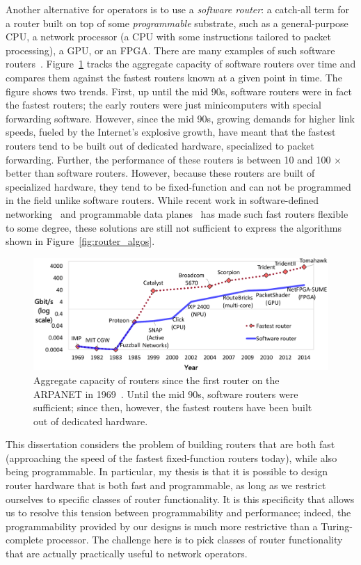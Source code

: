 Another alternative for operators is to use a \textit{software router}: a
catch-all term for a router built on top of some \textit{programmable}
substrate, such as a general-purpose CPU, a network processor (a CPU with some
instructions tailored to packet processing), a GPU, or an FPGA. There are many
examples of such software routers~\cite{click, routebrucks, netfpga,
packetshader, ixp}. Figure~\ref{fig:router_evolution} tracks the aggregate
capacity of software routers over time and compares them against the fastest
routers known at a given point in time. The figure shows two trends. First, up
until the mid 90s, software routers were in fact the fastest routers; the early
routers were just minicomputers with special forwarding software. However,
since the mid 90s, growing demands for higher link speeds, fueled by the
Internet's explosive growth, have meant that the fastest routers tend to be
built out of dedicated hardware, specialized to packet forwarding. Further, the
performance of these routers is between 10 and 100 $\times$ better than
software routers. However, because these routers are built of specialized
hardware, they tend to be fixed-function and can not be programmed in the field
unlike software routers. While recent work in software-defined
networking~\cite{openflow} and programmable data planes~\cite{rmt, flexpipe,
xpliant, tofino} has made such fast routers flexible to some degree, these
solutions are still not sufficient to express the algorithms shown in
Figure~\ref{fig:router_algos}.

\begin{figure}
\centering
\includegraphics[width=\columnwidth]{router_evolution.pdf}
\caption{Aggregate capacity of routers since the first router on the ARPANET in
1969~\cite{imp}. Until the mid 90s, software routers were sufficient; since
then, however, the fastest routers have been built out of dedicated hardware.}
\label{fig:router_evolution}
\end{figure}

This dissertation considers the problem of building routers that are both fast
(\ie approaching the speed of the fastest fixed-function routers today), while
also being programmable. In particular, my thesis is that it is possible to
design router hardware that is both fast and programmable, as long as we
restrict ourselves to specific classes of router functionality. It is this
specificity that allows us to resolve this tension between programmability and
performance; indeed, the programmability provided by our designs is much more
restrictive than a Turing-complete processor. The challenge here is to pick
classes of router functionality that are actually practically useful to network
operators.

